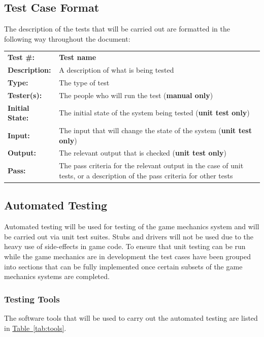 \documentclass[12pt, titlepage]{article}
\begin{document}
\subsection{Test Case Format}
The description of the tests that will be carried out are formatted in the following way throughout the document:

\begin{mdframed}[linewidth=1pt]
\begin{tabularx}{\textwidth}{@{}p{3cm}X@{}}
{\bf Test \#:} & {\bf Test name}\\[\baselineskip]
{\bf Description:} & A description of what is being tested\\[0.5\baselineskip]
{\bf Type:} & The type of test\\[0.5\baselineskip]
{\bf Tester(s):} & The people who will run the test ({\bf manual only})\\[0.5\baselineskip]
{\bf Initial State:} & The initial state of the system being tested ({\bf unit test only})\\[0.5\baselineskip]
{\bf Input:} &  The input that will change the state of the system ({\bf unit test only})\\[0.5\baselineskip]
{\bf Output:} & The relevant output that is checked ({\bf unit test only})\\[0.5\baselineskip]
{\bf Pass:} & The pass criteria for the relevant output in the case of unit tests, or a description of the pass criteria for other tests
\end{tabularx}
\end{mdframed}

\subsection{Automated Testing}
Automated testing will be used for testing of the game mechanics system and will be carried out via unit test suites.  Stubs and drivers will not be used due to the heavy use of side-effects in game code.  To ensure that unit testing can be run while the game mechanics are in development the test cases have been grouped into sections that can be fully implemented once certain subsets of the game mechanics systems are completed.

\subsubsection{Testing Tools}
The software tools that will be used to carry out the automated testing are listed in \hyperref[tab:tools]{Table~\ref*{tab:tools}}.
\end{document}
